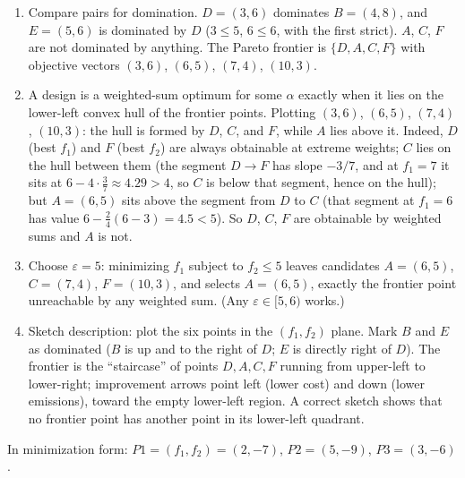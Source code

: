 \begin{enumerate}
\item Compare pairs for domination. $D = (3,6)$ dominates $B = (4,8)$, and
$E = (5,6)$ is dominated by $D$ ($3 \leq 5$, $6 \leq 6$, with the first
strict). $A$, $C$, $F$ are not dominated by anything. The Pareto frontier is
$\{D, A, C, F\}$ with objective vectors $(3,6)$, $(6,5)$, $(7,4)$, $(10,3)$.
\item A design is a weighted-sum optimum for some $\alpha$ exactly when it
lies on the lower-left convex hull of the frontier points. Plotting $(3,6)$,
$(6,5)$, $(7,4)$, $(10,3)$: the hull is formed by $D$, $C$, and $F$, while
$A$ lies above it. Indeed, $D$ (best $f_1$) and $F$ (best $f_2$) are always
obtainable at extreme weights; $C$ lies on the hull between them (the segment
$D \to F$ has slope $-3/7$, and at $f_1 = 7$ it sits at
$6 - 4 \cdot \tfrac{3}{7} \approx 4.29 > 4$, so $C$ is below that segment,
hence on the hull); but $A = (6,5)$ sits above the segment from $D$ to $C$
(that segment at $f_1 = 6$ has value $6 - \tfrac{2}{4}(6-3) = 4.5 < 5$). So
$D$, $C$, $F$ are obtainable by weighted sums and $A$ is not.
\item Choose $\varepsilon = 5$: minimizing $f_1$ subject to $f_2 \leq 5$
leaves candidates $A = (6,5)$, $C = (7,4)$, $F = (10,3)$, and selects
$A = (6,5)$, exactly the frontier point unreachable by any weighted sum.
(Any $\varepsilon \in [5, 6)$ works.)
\item Sketch description: plot the six points in the $(f_1, f_2)$ plane.
Mark $B$ and $E$ as dominated ($B$ is up and to the right of $D$; $E$ is
directly right of $D$). The frontier is the ``staircase'' of points $D, A,
C, F$ running from upper-left to lower-right; improvement arrows point left
(lower cost) and down (lower emissions), toward the empty lower-left region.
A correct sketch shows that no frontier point has another point in its
lower-left quadrant.
\end{enumerate}


In minimization form: $P1 = (f_1, f_2) = (2, -7)$, $P2 = (5, -9)$,
$P3 = (3, -6)$.

